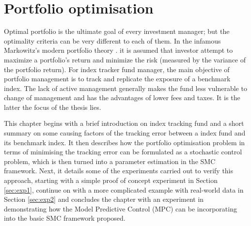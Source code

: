 \chapter{Portfolio optimisation}
\graphicspath{{Chapter4/figures/}}
\label{lab:PO}
Optimal portfolio is the ultimate goal of every investment manager; but the optimality criteria can be very different to each of them. In the infamous Markowitz's modern portfolio theory \cite{HM52}. it is assumed that investor attempt to maximize a portfolio's return and minimize the risk (measured by the variance of the portfolio return). For index tracker fund manager, the main objective of portfolio management is to track and replicate the exposure of a benchmark index. The lack of active management generally makes the fund less vulnerable to change of management and has the advantages of lower fees and taxes. It is the latter the focus of the thesis lies.
 
This chapter begins with a brief introduction on index tracking fund and a short summary on some causing factors of the tracking error between a index fund and its benchmark index. It then describes how the portfolio optimisation problem in terms of minimising the tracking error can be formulated as a stochastic control problem, which is then turned into a parameter estimation in the SMC framework. Next, it details some of the experiments carried out to verify this approach, starting with a simple proof of concept experiment in Section \ref{sec:exp1}, continue on with a more complicated example with real-world data in Section \ref{sec:exp2} and concludes the chapter with an experiment in demonstrating how the Model Predictive Control (MPC) can be incorporating into the basic SMC framework proposed.
 
 
